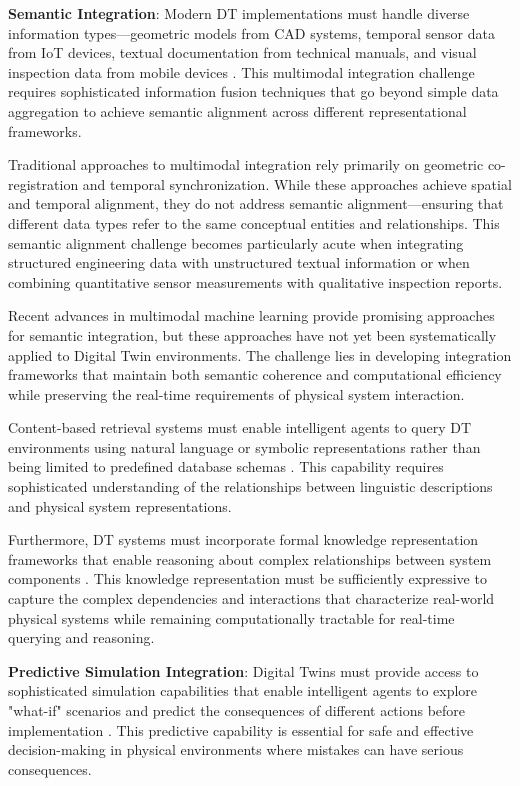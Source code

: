 \textbf{Semantic Integration}: Modern DT implementations must handle diverse information types—geometric models from CAD systems, temporal sensor data from IoT devices, textual documentation from technical manuals, and visual inspection data from mobile devices \cite{boje2020towards, lu2020digital}. This multimodal integration challenge requires sophisticated information fusion techniques that go beyond simple data aggregation to achieve semantic alignment across different representational frameworks.

Traditional approaches to multimodal integration rely primarily on geometric co-registration and temporal synchronization. While these approaches achieve spatial and temporal alignment, they do not address semantic alignment—ensuring that different data types refer to the same conceptual entities and relationships. This semantic alignment challenge becomes particularly acute when integrating structured engineering data with unstructured textual information or when combining quantitative sensor measurements with qualitative inspection reports.

Recent advances in multimodal machine learning \cite{baltrusaitis2018multimodal, ramesh2021zero} provide promising approaches for semantic integration, but these approaches have not yet been systematically applied to Digital Twin environments. The challenge lies in developing integration frameworks that maintain both semantic coherence and computational efficiency while preserving the real-time requirements of physical system interaction.

Content-based retrieval systems must enable intelligent agents to query DT environments using natural language or symbolic representations rather than being limited to predefined database schemas \cite{smeulders2000content, datta2008image}. This capability requires sophisticated understanding of the relationships between linguistic descriptions and physical system representations.

Furthermore, DT systems must incorporate formal knowledge representation frameworks that enable reasoning about complex relationships between system components \cite{gruber1993translation, studer1998knowledge}. This knowledge representation must be sufficiently expressive to capture the complex dependencies and interactions that characterize real-world physical systems while remaining computationally tractable for real-time querying and reasoning.

\textbf{Predictive Simulation Integration}: Digital Twins must provide access to sophisticated simulation capabilities that enable intelligent agents to explore "what-if" scenarios and predict the consequences of different actions before implementation \cite{negri2017review, kritzinger2018digital}. This predictive capability is essential for safe and effective decision-making in physical environments where mistakes can have serious consequences.

